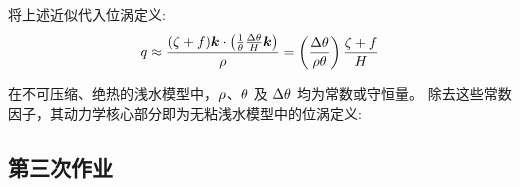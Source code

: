 \begin{enumerate}
    将上述近似代入位涡定义:
    \begin{equation*}
        q \approx \frac{(\zeta + f)\bm{k} \cdot \left(\frac{1}{\theta} \frac{\Delta \theta}{H} \bm{k}\right)}{\rho} = \left(\frac{\Delta \theta}{\rho \theta}\right) \frac{\zeta + f}{H}
    \end{equation*}

    在不可压缩、绝热的浅水模型中，$\rho$、$\theta$ 及 $\Delta \theta$ 均为常数或守恒量。
    除去这些常数因子，其动力学核心部分即为无粘浅水模型中的位涡定义:

\end{enumerate}

\subsection*{第三次作业}

